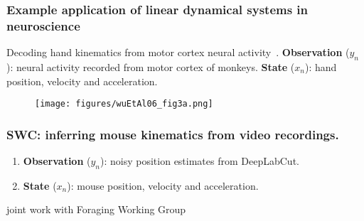 \begin{frame}
    \frametitle{Example application of linear dynamical systems in neuroscience}

    Decoding hand kinematics from motor cortex neural
    activity~\citep{wuEtAl06}.
%
    \textbf{Observation} ($y_n$): neural activity recorded from motor cortex of
    monkeys.
%
    \textbf{State} ($x_n$): hand position, velocity and acceleration.

    \begin{figure}[h]
        \begin{center}
            \texttt{[image: figures/wuEtAl06\_fig3a.png]}
        \end{center}
    \end{figure}
    \hfill\citet{wuEtAl06}

\end{frame}

\begin{frame}
    \frametitle{SWC: inferring mouse kinematics from video recordings.}

    \begin{enumerate}
        \item \textbf{Observation} ($y_n$): noisy position estimates from
            DeepLabCut.
        \item \textbf{State} ($x_n$): mouse position, velocity and
            acceleration.
    \end{enumerate}

    \hfill\tiny joint work with Foraging Working Group
\end{frame}

